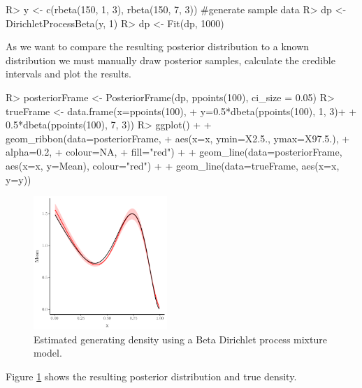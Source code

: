 \documentclass[nojss]{jss}
\begin{document}
\begin{Schunk}
\begin{Sinput}
R> y <- c(rbeta(150, 1, 3), rbeta(150, 7, 3)) #generate sample data
R> dp <- DirichletProcessBeta(y, 1)
R> dp <- Fit(dp, 1000)
\end{Sinput}
\end{Schunk}

As we want to compare the resulting posterior distribution to a known distribution we must manually draw posterior samples, calculate the credible intervals and plot the results.
\newpage
\begin{Schunk}
\begin{Sinput}
R> posteriorFrame <- PosteriorFrame(dp, ppoints(100), ci_size = 0.05)
R> trueFrame <- data.frame(x=ppoints(100),
+                          y=0.5*dbeta(ppoints(100), 1, 3)+
+                            0.5*dbeta(ppoints(100), 7, 3))
R> ggplot() +
+    geom_ribbon(data=posteriorFrame,
+                aes(x=x, ymin=X2.5., ymax=X97.5.),
+                alpha=0.2,
+                colour=NA,
+                fill="red") +
+    geom_line(data=posteriorFrame, aes(x=x, y=Mean), colour="red") +
+    geom_line(data=trueFrame, aes(x=x, y=y))
\end{Sinput}
\end{Schunk}

\begin{figure}[tb]
	\centering
	\includegraphics[width=0.45\textwidth]{img/betaGraph.pdf}
	\caption{Estimated generating density using a Beta Dirichlet process mixture model.}
	\label{fig:densitybounded}
\end{figure}
Figure \ref{fig:densitybounded} shows the resulting posterior distribution and true density.
\end{document}

